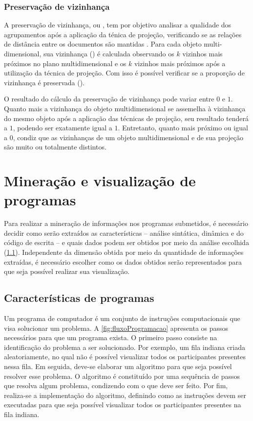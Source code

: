 			\subsubsection{Preservação de vizinhança}
			
				A preservação de vizinhança, ou 
				\cite{paulovich2008hipp}, tem por objetivo analisar a qualidade dos agrupamentos
				após a aplicação da ténica de projeção, verificando se as relações de distância
				entre os documentos são mantidas \cite{phd:paulovich}. Para cada objeto
				multi-dimensional, sua vizinhança () é calculada observando
				os $k$ vizinhos mais próximos no plano multidimensional e os $k$ vizinhos mais
				próximos após a utilização da técnica de projeção. Com isso é possível verificar
				se a proporção de vizinhança é preservada ().
				
				O resultado do cálculo da preservação de vizinhança pode variar entre $0$ e $1$.
				Quanto mais a vizinhança do objeto multidimensional se assemelha à vizinhança
				do mesmo objeto após a aplicação das técnicas de projeção, seu resultado tenderá a $1$,
				podendo ser exatamente igual a $1$. Entretanto, quanto mais próximo ou igual a
				$0$, condiz que as vizinhanças de um objeto multidimensional e de sua projeção
				são muito ou totalmente distintos.

	\section{Mineração e visualização de programas}
	\label{sec:MinVisual}
		Para realizar a mineração de informações nos programas submetidos, é necessário
		decidir como serão extraídos as características -- análise sintática, dinâmica e
		do código de escrita -- e quais dados podem ser obtidos por meio da análise
		escolhida (\cref{subSec:Caracteristicas}). Independente da dimensão
		obtida por meio da quantidade de informações extraídas, é necessário escolher
		como os dados obtidos serão representados para que seja possível realizar sua visualização.
		
		\subsection{Características de programas}
		\label{subSec:Caracteristicas}
			
			Um programa de computador é um conjunto de instruções computacionais que visa
			solucionar um problema. A \cref{fig:fluxoProgramacao} apresenta os passos
			necessários para que um programa exista. O primeiro passo consiste na
			identificação do problema a ser solucionado. Por exemplo, um fila indiana
			criada aleatoriamente, no qual não é possível visualizar todos os participantes
			presentes nessa fila. Em seguida, deve-se elaborar um algoritmo para que seja
			possível resolver esse problema. O algoritmo é constituído por uma sequência
			de passos que resolva algum problema, condizendo com o que deve ser feito.
			Por fim, realiza-se a implementação do algoritmo, definindo como as instruções
			devem ser executadas para que seja possível visualizar todos os participantes
			presentes na fila indiana.

